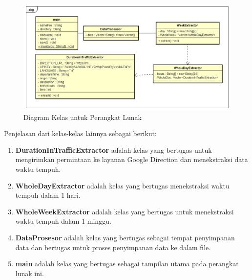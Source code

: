 \begin{figure}[H]
				\centering		
				\includegraphics[scale=0.4]{Gambar/ClassDiagram.png}
				\caption[Diagram Kelas untuk Perangkat Lunak]{Diagram Kelas untuk Perangkat Lunak}
				\label{fig:classdiagramawal}	
			\end{figure}
Penjelasan dari kelas-kelas lainnya sebagai berikut:
\begin{enumerate}
	\item \textbf{DurationInTrafficExtractor} adalah kelas yang bertugas untuk mengirimkan permintaan ke layanan Google Direction dan menekstraksi data waktu tempuh.
	\item \textbf{WholeDayExtractor} adalah kelas yang bertugas menekstraksi waktu tempuh dalam 1 hari.
	\item \textbf{WholeWeekExtractor} adalah kelas yang bertugas untuk menekstraksi waktu tempuh dalam 1 minggu.
	\item \textbf{DataProsesor} adalah kelas yang bertugas sebagai tempat penyimpanan data dan bertugas untuk proses penyimpanan data ke dalam file.
	\item \textbf{main} adalah kelas yang bertugas sebagai tampilan utama pada perangkat lunak ini.
\end{enumerate}